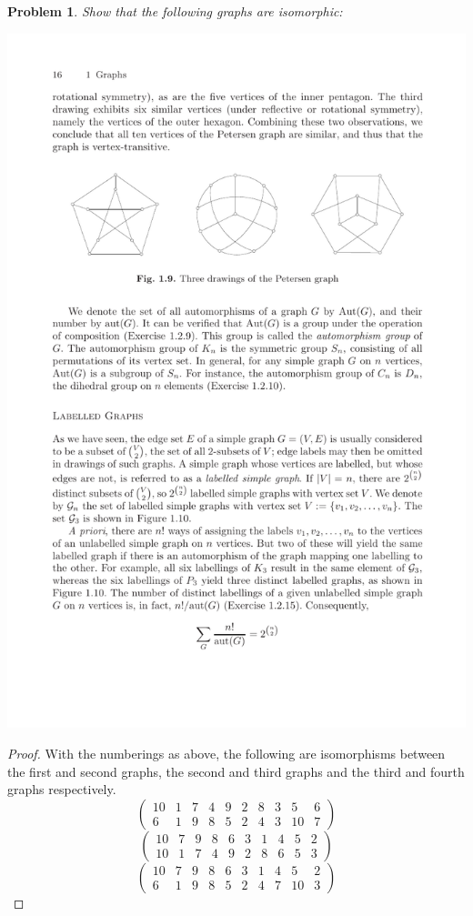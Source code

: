 \documentclass{article}
\newtheorem{problem}{Problem}
\begin{document}
\begin{flushleft}
\begin{problem}
Show that the following graphs are isomorphic:\\
\begin{center}
\includegraphics{Problem6}
\end{center}
\end{problem}
\begin{proof}
With the numberings as above, the following are isomorphisms between the first and second graphs, the second and third graphs and the third and fourth graphs respectively.
\[
\left (
\begin{array}{cccccccccc}
10 & 1 & 7 & 4 & 9 & 2 & 8 & 3 & 5 & 6\\
6 & 1 & 9 & 8 & 5 & 2 & 4 & 3 & 10 & 7
\end{array}
\right )
\]
\[
\left (
\begin{array}{cccccccccc}
10 & 7 & 9 & 8 & 6 & 3 & 1 & 4 & 5 & 2\\
10 & 1 & 7 & 4 & 9 & 2 & 8 & 6 & 5 & 3
\end{array}
\right )
\]
\[
\left (
\begin{array}{cccccccccc}
10 & 7 & 9 & 8 & 6 & 3 & 1 & 4 & 5 & 2\\
6 & 1 & 9 & 8 & 5 & 2 & 4 & 7 & 10 & 3
\end{array}
\right )
\]
\end{proof}

\end{flushleft}
\end{document}
